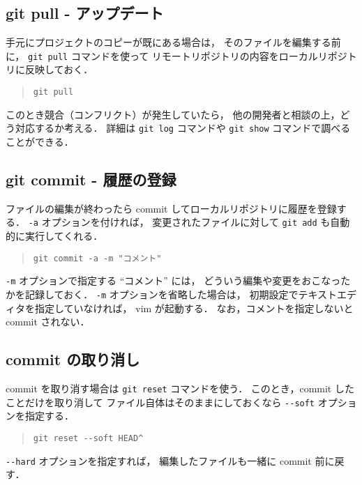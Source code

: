 \documentclass[a4j,10pt]{jarticle}
\begin{document}
\subsection{git pull - アップデート}
手元にプロジェクトのコピーが既にある場合は，
そのファイルを編集する前に，
\verb|git pull| コマンドを使って
リモートリポジトリの内容をローカルリポジトリに反映しておく．

\begin{quote}
\begin{verbatim}
git pull
\end{verbatim}
\end{quote}

このとき競合（コンフリクト）が発生していたら，
他の開発者と相談の上，どう対応するか考える．
詳細は \verb|git log| コマンドや
\verb|git show| コマンドで調べることができる．

\subsection{git commit - 履歴の登録}
ファイルの編集が終わったら commit してローカルリポジトリに履歴を登録する．
\verb|-a| オプションを付ければ，
変更されたファイルに対して \verb|git add| も自動的に実行してくれる．

\begin{quote}
\begin{verbatim}
git commit -a -m "コメント"
\end{verbatim}
\end{quote}

\verb|-m| オプションで指定する ``コメント'' には，
どういう編集や変更をおこなったかを記録しておく．
\verb|-m| オプションを省略した場合は，
初期設定でテキストエディタを指定していなければ，
vim が起動する．
なお，コメントを指定しないと commit されない．

\subsection{commit の取り消し}
commit を取り消す場合は \verb|git reset| コマンドを使う．
このとき，commit したことだけを取り消して
ファイル自体はそのままにしておくなら
\verb|--soft| オプションを指定する．

\begin{quote}
\begin{verbatim}
git reset --soft HEAD^
\end{verbatim}
\end{quote}

\verb|--hard| オプションを指定すれば，
編集したファイルも一緒に commit 前に戻す．
\end{document}
